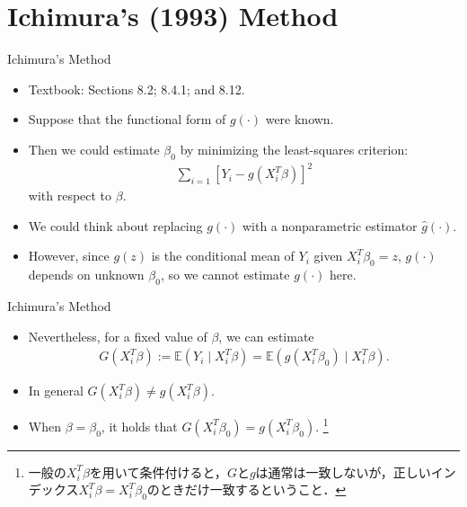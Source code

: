 \documentclass[xcolor=svgnames,dvipdfmx,cjk]{beamer}
\theoremstyle{example}
\begin{document}
\section{Ichimura's (1993) Method}


\begin{frame}{Ichimura's Method}
\begin{itemize}
  \item Textbook: Sections 8.2; 8.4.1; and 8.12.
  \item Suppose that the functional form of $g(\cdot)$ were known.
  \item Then we could estimate $\beta_0$ by minimizing the least-squares criterion:
        \begin{align*}
        \sum_{i=1} \left[ Y_i - g(X_i^{T}\beta) \right]^2
        \end{align*}
        with respect to $\beta$.
  \item We could think about replacing $g(\cdot)$ with a nonparametric estimator $\hat{g}(\cdot)$.
  \item However, since $g(z)$ is the conditional mean of $Y_i$ given $X_i^{T} \beta_0 = z$,
        \alert{$g(\cdot)$ depends on unknown $\beta_0$}, so we cannot estimate $g(\cdot)$ here.
\end{itemize}
\end{frame}

\begin{frame}{Ichimura's Method}
\begin{itemize}
  \item Nevertheless, \alert{for a fixed value of $\beta$}, we can estimate
        \begin{align*}
        G(X_i^{T} \beta) 
          := \mathbb{E} (Y_i \mid X_i^{T}\beta) 
           = \mathbb{E} (g(X_i^{T}\beta_0) \mid X_i^{T}\beta).
        \end{align*}
  \item In general $G(X_i^{T}\beta) \neq g(X_i^{T} \beta)$.
  \item When $\beta = \beta_0$,
        it holds that $G(X_i^{T}\beta_0) = g(X_i^{T} \beta_0)$.
        \footnote{一般の$X_i^{T}\beta$を用いて条件付けると，$G$と$g$は通常は一致しないが，正しいインデックス$X_i^{T}\beta = X_i^{T}\beta_0$のときだけ一致するということ．}
\end{itemize}  
\end{frame}
\end{document}
